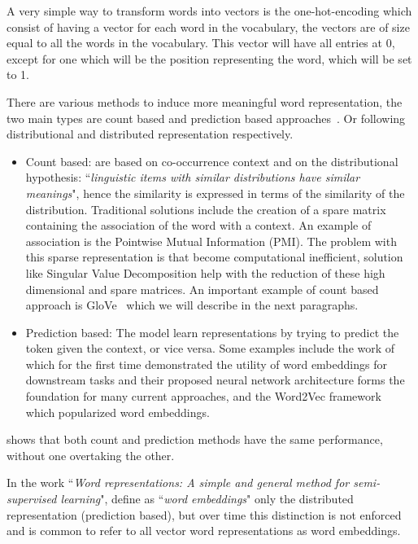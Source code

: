 A very simple way to transform words into vectors is the one-hot-encoding which consist of having a vector for each word in the vocabulary, the vectors are of size equal to all the words in the vocabulary. This vector will have all entries at 0, except for one which will be the position representing the word, which will be set to 1. 

There are various methods to induce more meaningful word representation, the two main types are count based and prediction based approaches~\citep{baroni-etal-2014-dont}. Or following~\cite{turian2010word} distributional and distributed representation respectively.


\begin{itemize}[- , itemsep = 0.1em]
\item Count based: are based on co-occurrence context and on the distributional hypothesis:  ``\textit{linguistic items with similar distributions have similar meanings}", hence the similarity is expressed in terms of the similarity of the distribution. Traditional solutions include the creation of a spare matrix containing the association of the word with a context. An example of association is the Pointwise Mutual Information (PMI). The problem with this sparse representation is that become computational inefficient, solution like Singular Value Decomposition help with the reduction of these high dimensional and spare matrices. An important example of count based approach is GloVe~\citep{pennington2014glove} which we will describe in the next paragraphs.

\item Prediction based: 
The model learn representations by trying to predict the token given the context, or vice versa. Some examples include the work of \citet{collobert2008a} which for the first time demonstrated the utility of word embeddings for downstream tasks and their proposed neural network architecture forms the foundation for many current approaches, and the Word2Vec framework ~\citep{mikolov2013models,mikolov2013distributed} which popularized word embeddings.
\end{itemize}

\cite{levy-etal-2015-improving} shows that both count and prediction methods have the same performance, without one overtaking the other.


In the work ``\textit{Word representations: A simple and general method for semi-supervised learning}", \citet{turian2010word} define as ``\textit{word embeddings}" only the distributed representation (prediction based), but over time this distinction is not enforced and is common to refer to all vector word representations as word embeddings. 

